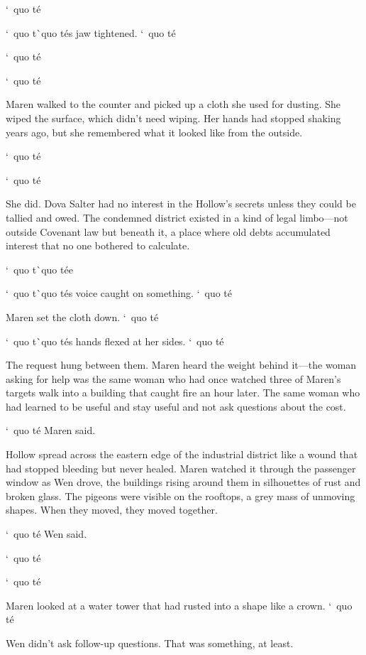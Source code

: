 \documentclass[12pt,letterpaper,openany]{book}
\begin{document}
\par
`\ quo t\'e{}
\par
`\ quo t\`\ quo t\'e{}s jaw tightened. `\ quo t\'e{}
\par
`\ quo t\'e{}
\par
`\ quo t\'e{}
\par
Maren walked to the counter and picked up a cloth she used for dusting. She wiped the surface, which didn't need wiping. Her hands had stopped shaking years ago, but she remembered what it looked like from the outside.
\par
`\ quo t\'e{}
\par
`\ quo t\'e{}
\par
She did. Dova Salter had no interest in the Hollow's secrets unless they could be tallied and owed. The condemned district existed in a kind of legal limbo—not outside Covenant law but beneath it, a place where old debts accumulated interest that no one bothered to calculate.
\par
`\ quo t\`\ quo t\'e{}e{}
\par
`\ quo t\`\ quo t\'e{}s voice caught on something. `\ quo t\'e{}
\par
Maren set the cloth down. `\ quo t\'e{}
\par
`\ quo t\`\ quo t\'e{}s hands flexed at her sides. `\ quo t\'e{}
\par
The request hung between them. Maren heard the weight behind it—the woman asking for help was the same woman who had once watched three of Maren's targets walk into a building that caught fire an hour later. The same woman who had learned to be useful and stay useful and not ask questions about the cost.
\par
`\ quo t\'e{} Maren said.
\par
\hrulefillThe Hollow spread across the eastern edge of the industrial district like a wound that had stopped bleeding but never healed. Maren watched it through the passenger window as Wen drove, the buildings rising around them in silhouettes of rust and broken glass. The pigeons were visible on the rooftops, a grey mass of unmoving shapes. When they moved, they moved together.
\par
`\ quo t\'e{} Wen said.
\par
`\ quo t\'e{}
\par
`\ quo t\'e{}
\par
Maren looked at a water tower that had rusted into a shape like a crown. `\ quo t\'e{}
\par
Wen didn't ask follow-up questions. That was something, at least.
\end{document}
